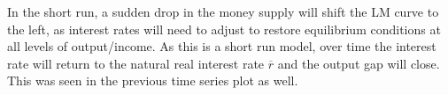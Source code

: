 \begin{homeworkProblem}[3]
\begin{center}
    \end{center}
    
    In the short run, a sudden drop in the money supply will shift the LM curve
    to the left, as interest rates will need to adjust to restore equilibrium
    conditions at all levels of output/income. As this is a short run model,
    over time the interest rate will return to the natural real interest rate
    $\overline{r}$ and the output gap will close. This was seen in the previous
    time series plot as well. 
    
\end{homeworkProblem}